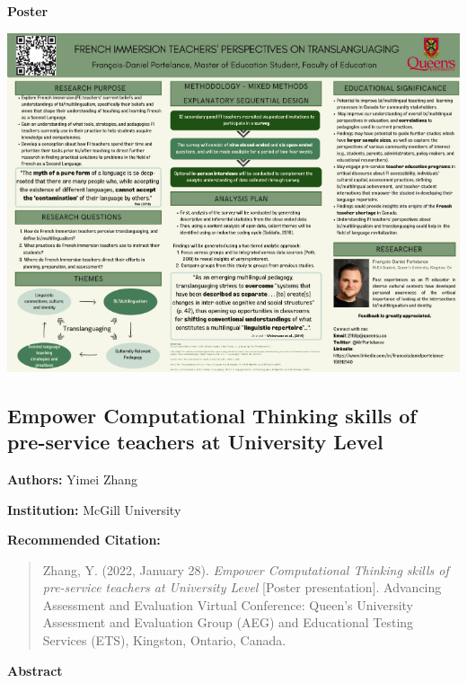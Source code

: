 \documentclass[
]{book}
\begin{document}
\textbf{Poster}

\includegraphics{Content/FDP.png}

\newpage

\hypertarget{empower-computational-thinking-skills-of-pre-service-teachers-at-university-level}{%
\subsection{Empower Computational Thinking skills of pre-service teachers at University Level}\label{empower-computational-thinking-skills-of-pre-service-teachers-at-university-level}}

\textbf{Authors:} Yimei Zhang

\textbf{Institution:} McGill University

\textbf{Recommended Citation:}

\begin{quote}
Zhang, Y. (2022, January 28). \emph{Empower Computational Thinking skills of pre-service teachers at University Level} {[}Poster presentation{]}. Advancing Assessment and Evaluation Virtual Conference: Queen's University Assessment and Evaluation Group (AEG) and Educational Testing Services (ETS), Kingston, Ontario, Canada.
\end{quote}

\textbf{Abstract}
\end{document}
